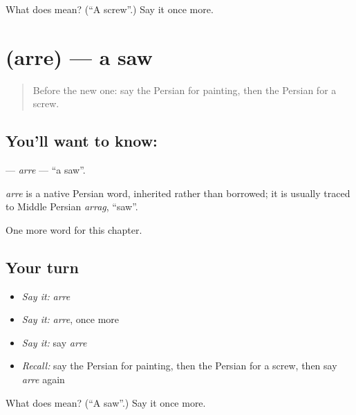 \begin{tcolorbox}[breakable,colback=teal!4,colframe=teal!35!black,title={Before you move on}]
What does  mean? (\textquotedblleft{}A screw\textquotedblright{}.) Say it once more.
\end{tcolorbox}
\section[\texorpdfstring{\fa{اره} (arre)}{اره (arre)}]{ (arre) — a saw}

\label{lesson:FA-C281-arre}



\begin{quote}
Before the new one: say the Persian for painting, then the Persian for a screw.
\end{quote}

\subsection*{You'll want to know: }
\textbf{} — \emph{arre} — \textquotedblleft{}a saw\textquotedblright{}.

\begin{cousinweb}
\emph{arre} is a native Persian word, inherited rather than borrowed; it is usually traced to Middle Persian \emph{arrag}, \textquotedblleft{}saw\textquotedblright{}.
\end{cousinweb}

\begin{grammarlens}[title={What you've built}]
One more word for this chapter.
\end{grammarlens}

\subsection*{Your turn}
\begin{itemize}
\raggedright
  \item \emph{Say it:} \emph{arre}
  \item \emph{Say it:} \emph{arre}, once more
  \item \emph{Say it:} say \emph{arre}
  \item \emph{Recall:} say the Persian for painting, then the Persian for a screw, then say \emph{arre} again
\end{itemize}

\begin{tcolorbox}[breakable,colback=teal!4,colframe=teal!35!black,title={Before you move on}]
What does  mean? (\textquotedblleft{}A saw\textquotedblright{}.) Say it once more.
\end{tcolorbox}
